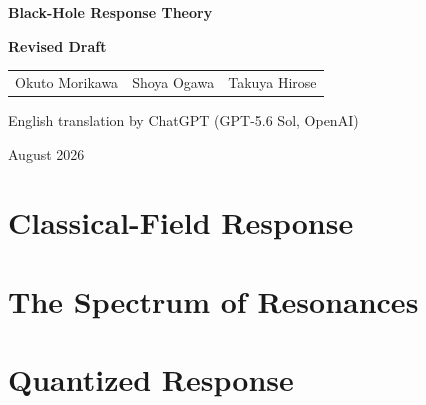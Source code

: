 \documentclass[11pt,openany]{book}
\newif\ifappendixmode
\let\originalappendix\appendix
\renewcommand{\appendix}{\originalappendix\appendixmodetrue}
\theoremstyle{definition}
\begin{document}
\frontmatter
\begin{titlepage}
\centering
\vspace*{2.5cm}

{\Huge\bfseries Black-Hole Response Theory\par}
\vspace{0.8cm}
{\large\bfseries Revised Draft\par}

\vspace{2.0cm}
\begin{tabular}{ccc}
  {\large Okuto Morikawa}
    & {\large Shoya Ogawa}
    & {\large Takuya Hirose}
\end{tabular}

\vspace{0.8cm}
{\large English translation by ChatGPT (GPT-5.6 Sol, OpenAI)\par}

\vfill
{\large August 2026\par}
\end{titlepage}



\clearpage

\clearpage

\tableofcontents
\clearpage

\mainmatter
\part{Classical-Field Response}






\part{The Spectrum of Resonances}



\part{Quantized Response}






\appendix


\backmatter


\printindex
\end{document}
